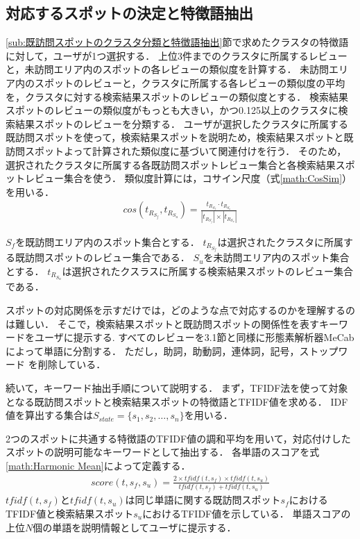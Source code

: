 \documentclass{deimj}
\begin{document}
\subsection{対応するスポットの決定と特徴語抽出}
\ref{sub:既訪問スポットのクラスタ分類と特徴語抽出}節で求めたクラスタの特徴語に対して，ユーザが1つ選択する．
上位3件までのクラスタに所属するレビューと，未訪問エリア内のスポットの各レビューの類似度を計算する．
未訪問エリア内のスポットのレビューと，クラスタに所属する各レビューの類似度の平均を，クラスタに対する検索結果スポットのレビューの類似度とする．
検索結果スポットのレビューの類似度がもっとも大きい，かつ0.125以上のクラスタに検索結果スポットのレビューを分類する．
ユーザが選択したクラスタに所属する既訪問スポットを使って，検索結果スポットを説明ため，検索結果スポットと既訪問スポットよって計算された類似度に基づいて関連付けを行う．
そのため，選択されたクラスタに所属する各既訪問スポットレビュー集合と各検索結果スポットレビュー集合を使う．
類似度計算には，コサイン尺度（式\ref{math:CosSim}）を用いる．
\begin{eqnarray}
  cos(t_{R_{S_f}},t_{R_{S_u}})=\frac{t_{R_{S_f}} \cdot t_{R_{S_u}}}{|t_{R_{S_f}}| \times |t_{R_{S_u}}|}
  \label{math:CosSim}
\end{eqnarray}

$S_f$を既訪問エリア内のスポット集合とする．
$t_{R_{S_f}}$は選択されたクラスタに所属する既訪問スポットのレビュー集合である．
$S_u$を未訪問エリア内のスポット集合とする．
$t_{R_{S_u}}$は選択されたクスラスに所属する検索結果スポットのレビュー集合である．

スポットの対応関係を示すだけでは，どのような点で対応するのかを理解するのは難しい．
そこで，検索結果スポットと既訪問スポットの関係性を表すキーワードをユーザに提示する.
すべてのレビューを3.1節と同様に形態素解析器MeCabによって単語に分割する．
ただし，助詞，助動詞，連体詞，記号，ストップワード を削除している．

続いて，キーワード抽出手順について説明する．
まず，TFIDF法を使って対象となる既訪問スポットと検索結果スポットの特徴語とTFIDF値を求める．
IDF値を算出する集合は$S_{state} =\{s_1,s_2,\dots,s_n\}$を用いる．

2つのスポットに共通する特徴語のTFIDF値の調和平均を用いて，対応付けしたスポットの説明可能なキーワードとして抽出する．
各単語のスコアを式\ref{math:Harmonic Mean}によって定義する．
\begin{eqnarray}
  score(t,s_f,s_u) = \frac{2 \times tfidf(t,s_f) \times tfidf(t,s_u)}{tfidf(t,s_f) + tfidf(t,s_u)}
  \label{math:Harmonic Mean}
\end{eqnarray}
$tfidf(t,s_f)$と$tfidf(t,s_u)$は同じ単語に関する既訪問スポット$s_f$におけるTFIDF値と検索結果スポット$s_u$におけるTFIDF値を示している．
単語スコアの上位$N$個の単語を説明情報としてユーザに提示する．
\end{document}
